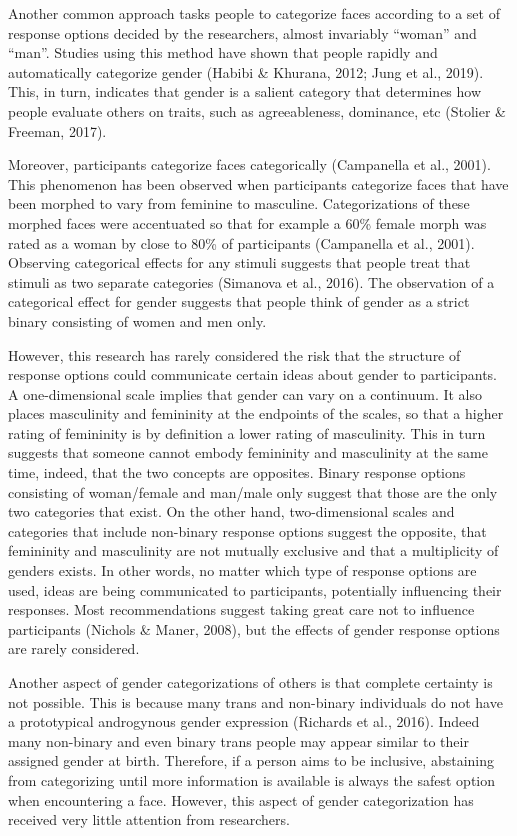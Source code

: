 \documentclass[
  man,
  longtable,
  nolmodern,
  notxfonts,
  notimes,
  colorlinks=true,linkcolor=blue,citecolor=blue,urlcolor=blue]{apa7}
\begin{document}
Another common approach tasks people to categorize faces according to a
set of response options decided by the researchers, almost invariably
``woman'' and ``man''. Studies using this method have shown that people
rapidly and automatically categorize gender (Habibi \& Khurana, 2012;
Jung et al., 2019). This, in turn, indicates that gender is a salient
category that determines how people evaluate others on traits, such as
agreeableness, dominance, etc (Stolier \& Freeman, 2017).

Moreover, participants categorize faces categorically (Campanella et
al., 2001). This phenomenon has been observed when participants
categorize faces that have been morphed to vary from feminine to
masculine. Categorizations of these morphed faces were accentuated so
that for example a 60\% female morph was rated as a woman by close to
80\% of participants (Campanella et al., 2001). Observing categorical
effects for any stimuli suggests that people treat that stimuli as two
separate categories (Simanova et al., 2016). The observation of a
categorical effect for gender suggests that people think of gender as a
strict binary consisting of women and men only.

However, this research has rarely considered the risk that the structure
of response options could communicate certain ideas about gender to
participants. A one-dimensional scale implies that gender can vary on a
continuum. It also places masculinity and femininity at the endpoints of
the scales, so that a higher rating of femininity is by definition a
lower rating of masculinity. This in turn suggests that someone cannot
embody femininity and masculinity at the same time, indeed, that the two
concepts are opposites. Binary response options consisting of
woman/female and man/male only suggest that those are the only two
categories that exist. On the other hand, two-dimensional scales and
categories that include non-binary response options suggest the
opposite, that femininity and masculinity are not mutually exclusive and
that a multiplicity of genders exists. In other words, no matter which
type of response options are used, ideas are being communicated to
participants, potentially influencing their responses. Most
recommendations suggest taking great care not to influence participants
(Nichols \& Maner, 2008), but the effects of gender response options are
rarely considered.

Another aspect of gender categorizations of others is that complete
certainty is not possible. This is because many trans and non-binary
individuals do not have a prototypical androgynous gender expression
(Richards et al., 2016). Indeed many non-binary and even binary trans
people may appear similar to their assigned gender at birth. Therefore,
if a person aims to be inclusive, abstaining from categorizing until
more information is available is always the safest option when
encountering a face. However, this aspect of gender categorization has
received very little attention from researchers.
\end{document}
